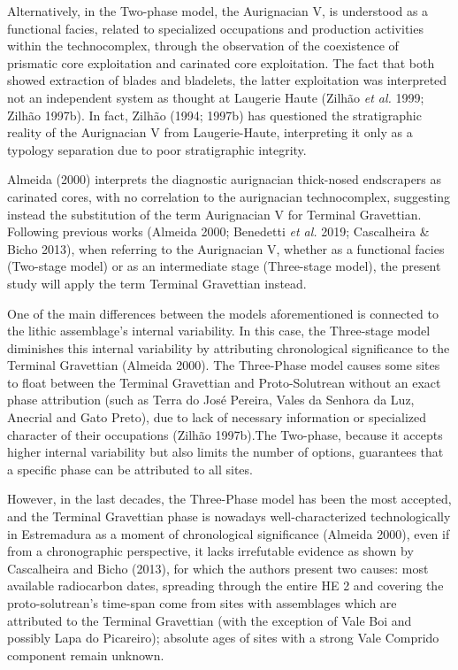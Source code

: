 \documentclass[12pt,twoside]{reedthesis}
\begin{document}
Alternatively, in the Two-phase model, the Aurignacian V, is understood as a functional facies, related to specialized occupations and production activities within the technocomplex, through the observation of the coexistence of prismatic core exploitation and carinated core exploitation. The fact that both showed extraction of blades and bladelets, the latter exploitation was interpreted not an independent system as thought at Laugerie Haute (Zilhão \emph{et al.} 1999; Zilhão 1997b). In fact, Zilhão (1994; 1997b) has questioned the stratigraphic reality of the Aurignacian V from Laugerie-Haute, interpreting it only as a typology separation due to poor stratigraphic integrity.

Almeida (2000) interprets the diagnostic aurignacian thick-nosed endscrapers as carinated cores, with no correlation to the aurignacian technocomplex, suggesting instead the substitution of the term Aurignacian V for Terminal Gravettian. Following previous works (Almeida 2000; Benedetti \emph{et al.} 2019; Cascalheira \& Bicho 2013), when referring to the Aurignacian V, whether as a functional facies (Two-stage model) or as an intermediate stage (Three-stage model), the present study will apply the term Terminal Gravettian instead.

One of the main differences between the models aforementioned is connected to the lithic assemblage's internal variability. In this case, the Three-stage model diminishes this internal variability by attributing chronological significance to the Terminal Gravettian (Almeida 2000). The Three-Phase model causes some sites to float between the Terminal Gravettian and Proto-Solutrean without an exact phase attribution (such as Terra do José Pereira, Vales da Senhora da Luz, Anecrial and Gato Preto), due to lack of necessary information or specialized character of their occupations (Zilhão 1997b).The Two-phase, because it accepts higher internal variability but also limits the number of options, guarantees that a specific phase can be attributed to all sites.

However, in the last decades, the Three-Phase model has been the most accepted, and the Terminal Gravettian phase is nowadays well-characterized technologically in Estremadura as a moment of chronological significance (Almeida 2000), even if from a chronographic perspective, it lacks irrefutable evidence as shown by Cascalheira and Bicho (2013), for which the authors present two causes: most available radiocarbon dates, spreading through the entire HE 2 and covering the proto-solutrean's time-span come from sites with assemblages which are attributed to the Terminal Gravettian (with the exception of Vale Boi and possibly Lapa do Picareiro); absolute ages of sites with a strong Vale Comprido component remain unknown.
\end{document}
